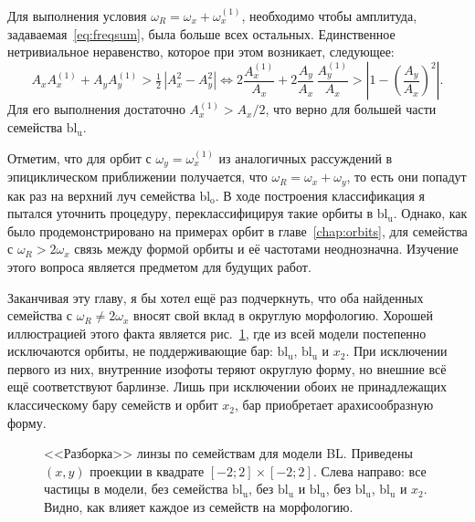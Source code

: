 \documentclass[tikz]{trlnotes}
\begin{document}
Для выполнения условия $ω_R = ω_x + ω_x^{(1)}$, необходимо чтобы амплитуда, задаваемая~\eqref{eq:freqsum}, была
больше всех остальных. Единственное нетривиальное неравенство, которое при этом возникает, следующее:
\begin{equation}
  A_xA_x^{(1)} + A_yA_y^{(1)} > \tfrac{1}{2}\,\left|A_x^2 - A_y^2\right| \iff
  2\frac{A_x^{(1)}}{A_x} + 2\frac{A_y}{A_x}\,\frac{A_y^{(1)}}{A_x} > \left|1 -
  \left(\frac{A_y}{A_x}\right)^2\right|.
\end{equation}
Для его выполнения достаточно $A_x^{(1)} > A_x/2$, что верно для большей части семейства $\text{bl}_\text{u}$.

Отметим, что для орбит с $ω_y = ω_x^{(1)}$ из аналогичных рассуждений в эпициклическом приближении получается, что
$ω_R = ω_x + ω_y$, то есть они попадут как раз на верхний луч семейства $\text{bl}_\text{o}$. В ходе построения
классификация я пытался уточнить процедуру, переклассифицируя такие орбиты в $\text{bl}_\text{u}$. Однако, как
было продемонстрировано на примерах орбит в главе~\ref{chap:orbits}, для семейства с $ω_R > 2 ω_x$ связь между
формой орбиты и её частотами неоднозначна. Изучение этого вопроса является предметом для будущих работ.

Заканчивая эту главу, я бы хотел ещё раз подчеркнуть, что оба найденных семейства с $ω_R \neq 2ω_x$ вносят свой вклад в
округлую морфологию. Хорошей иллюстрацией этого факта является рис.~\ref{fig:lensapart}, где из всей модели постепенно
исключаются орбиты, не поддерживающие бар: $\text{bl}_\text{u}$, $\text{bl}_\text{u}$ и $x_2$. При исключении
первого из них, внутренние изофоты теряют округлую форму, но внешние всё ещё соответствуют барлинзе.
Лишь при исключении обоих не принадлежащих классическому бару семейств и орбит $x_2$, бар приобретает арахисообразную форму.
\begin{figure}[htpb]
  \centering
  \caption{<<Разборка>> линзы по семействам для модели BL. Приведены $(x,y)$ проекции в квадрате $[-2;2]\times [-2;2]$.
  Слева направо: все частицы в модели, без семейства $\text{bl}_\text{u}$, без $\text{bl}_\text{u}$ и $\text{bl}_\text{u}$, 
без $\text{bl}_\text{u}$, $\text{bl}_\text{u}$ и $x_2$. Видно, как влияет каждое из семейств на морфологию.}%
  \label{fig:lensapart}
\end{figure}
\end{document}
